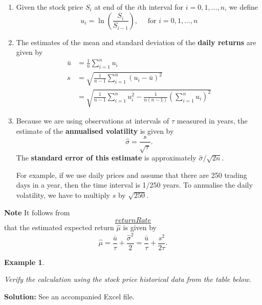 \documentclass[landscape, 20pt]{extreport}
\theoremstyle{definition}
\theoremstyle{definition}
\newtheorem{example}{Example}[chapter]
\theoremstyle{definition}
\theoremstyle{definition}
\theoremstyle{remark}
\begin{document}
\begin{enumerate}
\def\labelenumi{\arabic{enumi}.}
\item
  Given the stock price \(S_i\) at end of the \(i\)th interval for
  \(i = 0,1, \ldots, n\), we define
  \[u_i = \ln \left(\frac{S_i}{S_{i-1}} \right), \quad \text{ for } i = 0,1, \ldots, n\]
\item
  The estimates of the mean and standard deviation of the \textbf{daily
  returns} are given by \[\begin{aligned}
      \bar{u} &= \frac{1}{n} \sum_{i=1}^n u_i \\
      s &= \sqrt{\frac{1}{n-1} \sum_{i=1}^n (u_i - \bar{u})^2 } \\
          &= \sqrt{\frac{1}{n-1} \sum_{i=1}^n    u_i^2 - \frac{1}{n(n-1)}  \left(\sum_{i=1}^n u_i  \right)^2 }\end{aligned}\]
\item
  Because we are using observations at intervals of \(\tau\) measured in
  years, the estimate of the \textbf{annualised volatility} is given by
  \[\hat{\sigma} = \frac{s}{\sqrt{\tau}}.\] The \textbf{standard error of
  this estimate} is approximately \(\hat{\sigma}/\sqrt{2n}\).

  For example, if we use daily prices and assume that there are 250
  trading days in a year, then the time interval is 1/250 years. To
  annualise the daily volatility, we have to multiply \(s\) by
  \(\sqrt{250}\).
\end{enumerate}

\textbf{Note} It follows from
\protect\hyperlink{returnRate}{\[returnRate\]} that the estimated expected return \(\hat{\mu}\)
is given by
\[\hat{\mu}  =  \frac{\bar{u}}{\tau}  + \frac{\hat{\sigma}^2}{2} = \frac{\bar{u}}{\tau}  + \frac{s^2}{2\tau} .\]

\newpage \begin{example}
\protect\hypertarget{exm:unlabeled-div-75}{}\label{exm:unlabeled-div-75}

\emph{Verify the calculation using the stock price
historical data from the table below.}

\end{example}

\textbf{Solution:} See an accompanied Excel file.
\end{document}
